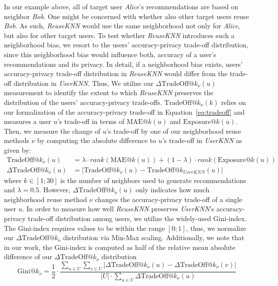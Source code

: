 \documentclass[manuscript,review,anonymous]{acmart}
\begin{document}
In our example above, all of target user \emph{Alice}'s recommendations are based on neighbor \emph{Bob}.
One might be concerned with whether also other target users reuse \emph{Bob}. 
As such, \emph{ReuseKNN} would use the same neighborhood not only for \emph{Alice}, but also for other target users.
To test whether \emph{ReuseKNN} introduces such a neighborhood bias, we resort to the users' accuracy-privacy trade-off distribution, since this neighborhood bias would influence both, accuracy of a user's recommendations and its privacy.
In detail, if a neighborhood bias exists, users' accuracy-privacy trade-off distribution in \emph{ReuseKNN} would differ from the trade-off distribution in \emph{UserKNN}.
Thus, We utilize our $\Delta\text{TradeOff}@k_\nu(u)$ measurement to identify the extent to which \emph{ReuseKNN} preserves the distribution of the users' accuracy-privacy trade-offs.
$\text{TradeOff}@k_\nu(k)$ relies on our formalization of the accuracy-privacy trade-off in Equation~\ref{eq:tradeoff} and measures a user $u$'s trade-off in terms of $\mathrm{MAE}@k(u)$ and $\mathrm{Exposure}@k(u)$.
Then, we measure the change of $u$'s trade-off by one of our neighborhood reuse methods $\nu$ by computing the absolute difference to $u$'s trade-off in \emph{UserKNN} as given by: 
\begin{align}
    \text{TradeOff}@k_\nu(u) &= \lambda \cdot rank(\mathrm{MAE}@k(u)) + (1 - \lambda) \cdot rank(\mathrm{Exposure}@k(u)) \\
    \Delta \text{TradeOff}@k_\nu(u) &= |\text{TradeOff}@k_\nu(u) - \text{TradeOff}@k_{UserKNN}(u)|
\end{align}
where $k \in [1; 30]$ is the number of neighbors used to generate recommendations and $\lambda=0.5 $.
However, $\Delta \text{TradeOff}@k_\nu(u)$ only indicates how much neighborhood reuse method $\nu$ changes the accuracy-privacy trade-off of a single user $u$.
In order to measure how well \emph{ReuseKNN} preserves \emph{UserKNN}'s accuracy-privacy trade-off distribution among users, we utilize the widely-used Gini-index.
The Gini-index requires values to be within the range $[0; 1]$, thus, we normalize our $\Delta \text{TradeOff}@k_\nu$ distribution via Min-Max scaling.
Additionally, we note that in our work, the Gini-index is computed as half of the relative mean absolute difference of our $\Delta \text{TradeOff}@k_\nu$ distribution~\cite{sen1997economic}
\begin{equation}
    \mathrm{Gini}@k_\nu = \frac{1}{2}\cdot\frac{\sum_{u \in U} \sum_{v \in U} | \Delta \text{TradeOff}@k_\nu(u) - \Delta \text{TradeOff}@k_\nu(v) |}{|U| \cdot \sum_{u \in U} \Delta \text{TradeOff}@k_\nu(u)}
\end{equation}
\end{document}

